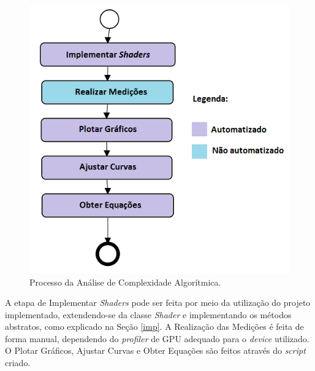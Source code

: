 	\begin{figure}[h]
	\centering
		\includegraphics[keepaspectratio=true,scale=0.8]{figuras/processo.png}
	\caption{Processo da Análise de Complexidade Algorítmica.}
	\label{processo}
	\end{figure}
	

	A etapa de Implementar \textit{Shaders} pode ser feita por meio da utilização do projeto implementado, extendendo-se da classe \textit{Shader} e implementando os métodos abstratos, como explicado na Seção \ref{imp}. A Realização das Medições é feita de forma manual, dependendo do \textit{profiler} de GPU adequado para o \textit{device} utilizado. O Plotar Gráficos, Ajustar Curvas e Obter Equações são feitos através do \textit{script} criado.
